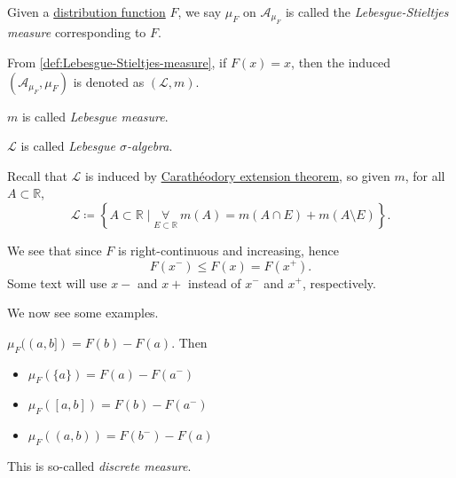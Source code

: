 \begin{definition}\label{def:Lebesgue-Stieltjes-measure}
	Given a \hyperref[def:distribution-function]{distribution function} \(F\), we say \(\mu _F\) on \(\mathcal{A} _{\mu _F}\) is called the \emph{Lebesgue-Stieltjes measure} corresponding to \(F\).
\end{definition}

\begin{definition*}
	From \autoref{def:Lebesgue-Stieltjes-measure}, if \(F(x)=x\), then the induced \((\mathcal{A} _{\mu _F}, \mu _{F})\) is denoted as \((\mathcal{L} , m)\).
	\begin{definition}\label{def:Lebesgue-measure}
		\(m\) is called \emph{Lebesgue measure}.
	\end{definition}
	\begin{definition}\label{def:Lebesgue-sigma-algebra}
		\(\mathcal{L} \) is called \emph{Lebesgue \(\sigma\)-algebra}.
	\end{definition}
\end{definition*}


\begin{remark}
	Recall that \(\mathcal{L} \) is induced by \hyperref[thm:Caratheodory-extension]{Carathéodory extension theorem}, so given \(m\), for all \(A\subset \mathbb{R} \),
	\[
		\mathcal{L} \coloneqq \left\{A\subset \mathbb{R} \mid \underset{E\subset \mathbb{R} }{\forall }\ m(A) = m(A\cap E) + m(A\setminus E)\right\}.
	\]
\end{remark}

\begin{note}
	We see that since \(F\) is right-continuous and increasing, hence
	\[
		F(x^-)\leq F(x) = F(x^+).
	\]
	Some text will use \(x-\) and \(x+\) instead of \(x^-\) and \(x^+\), respectively.
\end{note}

We now see some examples.

\begin{eg}\label{eg:discrete-measure}
	\(\mu _F((a, b]) = F(b) - F(a)\). Then
	\begin{itemize}
		\item \(\mu _F(\{a\}) = F(a) - F(a^-)\)
		\item \(\mu _F([a, b]) = F(b) - F(a^-)\)
		\item \(\mu _F((a, b)) = F(b^-) - F(a)\)
	\end{itemize}
	This is so-called \emph{discrete measure}.
\end{eg}

